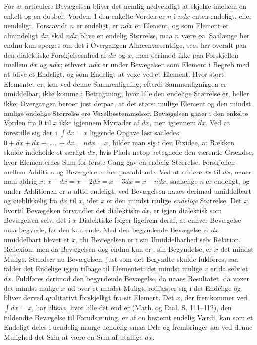 \documentclass[12pt,a4paper]{book}
\begin{document}
For at articulere Bevægelsen bliver det nemlig nødvendigt at skjelne
imellem en enkelt og en dobbelt Vorden. I den enkelte Vorden er $n$ i
$ndx$ enten endeligt, eller uendeligt. Forsaavidt $n$ er endeligt, er
$ndx$ et Element, og som Element et almindeligt $dx$; skal $ndx$ blive
en endelig Størrelse, maa $n$ være $\infty$. Saalænge her endnu kun
spørges om det i
Overgangen Almeenvæsentlige, sees her overalt paa den dialektiske
Forskjelseenhed af $dx$ og $x$, men derimod ikke paa Forskjellen
imellem $dx$ og $ndx$; ethvert $ndx$ er under Bevægelsen som Element i
Begreb med at blive et Endeligt, og som Endeligt at voxe ved et
Element. Hvor stort Elementet er, kan ved denne Sammenligning, efterdi
Sammenligningen er umiddelbar, ikke komme i Betragtning, hvor lille den
endelige Størrelse er, heller ikke; Overgangen beroer just derpaa, at
det størst mulige Element og den mindst mulige endelige Størrelse ere
Vexelbestemmelser. Bevægelsen gaaer i den enkelte Vorden fra $0$ til
$x$ ikke igjennem Myriader af $dx$, men igjennem $dx$. Ved at
forestille sig den i $\int dx = x$ liggende Opgave løst saaledes: $0 +
dx + dx +\,....\,+ dx = ndx = x$, hilder man sig i den Fixidee, at
Rækken skulde indeholde et særligt $dx$, hvis Plads netop betegnede den
værende Grændse, hvor Elementernes Sum for første Gang gav en endelig
Størrelse. Forskjellen mellem Addition og Bevægelse er her
paafaldende. Ved at addere $dx$ til $dx$, naaer man aldrig $x$; $x -
dx = x - 2dx = x - 3dx = x - ndx$, saalænge $n$ er endeligt, og under
Additionen er $n$ altid endeligt; ved Bevægelsen naaes derimod
umiddelbart og øieblikkelig fra $dx$ til $x$, idet $x$ er den mindst
mulige \emph{endelige} Størrelse. Det $x$, hvortil Bevægelsen
forvandler det dialektiske $dx$, er igjen dialektisk som Bevægelsen
selv; det i $x$ Dialektiske følger ligefrem deraf, at enhver Bevægelse
maa begynde, før den kan ende. Med den begyndende Bevægelse er $dx$
umiddelbart blevet et $x$, thi Bevægelsen er i sin Umiddelbarhed selv
Relation, Reflexion; men da Bevægelsen dog endnu kun er i sin
Begyndelse, er $x$ det mindst Mulige. Standser nu Bevægelsen, just som
det Begyndte skulde fuldføres, saa falder det Endelige igjen tilbage
til Elementet: det mindst mulige $x$ er da selv et $dx$. Fuldføres
derimod den begyndende Bevægelse, da naaes Resultatet, da voxer det
mindst
\setcounter{footnote}{0}
mulige $x$ ud over et mindst Muligt, rodfæster sig i det Endelige og
bliver derved qvalitativt forskjelligt fra sit Element. Det $x$, der
fremkommer ved $\int dx = x$, har altsaa, hvor lille det end er (Math.
og Dial. S. 111--112), den fuldendte Bevægelse til Forudsætning, er af
en bestemt endelig Værdi, kan som et Endeligt deles i uendelig mange
uendelig smaa Dele og frembringer saa ved denne Mulighed det Skin at
være en Sum af utallige $dx$.
\end{document}
